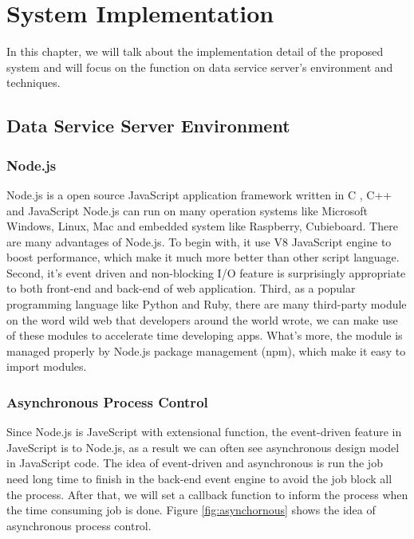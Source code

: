 \chapter{System Implementation}\label{cha:Implementation}
In this chapter, we will talk about the implementation detail of the proposed system and will focus on the function on data service server's environment and techniques.

\section{Data Service Server Environment}

\subsection{Node.js}
Node.js \cite{nodejs} is a open source JavaScript application framework written in C \cite{clang}, C++ \cite{cplus} and JavaScript \cite{javascript}
Node.js can run on many operation systems like Microsoft Windows, Linux, Mac and embedded system like Raspberry, Cubieboard.
There are many advantages of Node.js.
To begin with, it use V8 JavaScript engine to boost performance, which make it much more better than other script language.
Second, it's event driven and non-blocking I/O feature is surprisingly appropriate to both front-end and back-end of web application.
Third, as a popular programming language like Python and Ruby, there are many third-party module on the word wild web that developers around the world wrote,
we can make use of these modules to accelerate time developing apps. What's more, the module is managed properly by Node.js package management (npm), which make it easy to import modules.
\subsection{Asynchronous Process Control}
Since Node.js is JaveScript with extensional function, the event-driven feature in JaveScript is to Node.js, as a result we can often see asynchronous design model in JavaScript code.
The idea of event-driven and asynchronous is run the job need long time to finish in the back-end event engine to avoid the job block all the process.
After that, we will set a callback function to inform the process when the time consuming job is done.
Figure \ref{fig:asynchornous} shows the idea of asynchronous process control.

